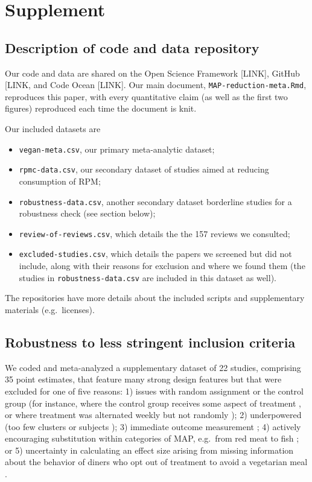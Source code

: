 \documentclass[sn-nature,referee,pdflatex]{sn-jnl}
\begin{document}
\newpage

\section{Supplement}\label{Sec5}

\subsection{Description of code and data
repository}\label{description-of-code-and-data-repository}

Our code and data are shared on the Open Science Framework {[}LINK{]},
GitHub {[}LINK, and Code Ocean {[}LINK{]}. Our main document,
\texttt{MAP-reduction-meta.Rmd}, reproduces this paper, with every
quantitative claim (as well as the first two figures) reproduced each
time the document is knit.

Our included datasets are

\begin{itemize}
\item
  \texttt{vegan-meta.csv}, our primary meta-analytic dataset;
\item
  \texttt{rpmc-data.csv}, our secondary dataset of studies aimed at
  reducing consumption of RPM;
\item
  \texttt{robustness-data.csv}, another secondary dataset borderline
  studies for a robustness check (see section below);
\item
  \texttt{review-of-reviews.csv}, which details the the 157 reviews we
  consulted;
\item
  \texttt{excluded-studies.csv}, which details the papers we screened
  but did not include, along with their reasons for exclusion and where
  we found them (the studies in \texttt{robustness-data.csv} are
  included in this dataset as well).
\end{itemize}

The repositories have more details about the included scripts and
supplementary materials (e.g.~licenses).

\subsection{Robustness to less stringent inclusion
criteria}\label{Sec5.1.1}

We coded and meta-analyzed a supplementary dataset of 22 studies,
comprising 35 point estimates, that feature many strong design features
but that were excluded for one of five reasons: 1) issues with random
assignment or the control group (for instance, where the control group
receives some aspect of treatment \citep{piazza2022}, or where treatment
was alternated weekly but not randomly \citep{garnett2020}); 2)
underpowered (too few clusters \citep{reinders2017} or subjects
\citep{lentz2019}); 3) immediate outcome measurement
\citep{dannenberg2023, sparkman2017, griesoph2021, hansen2021}; 4)
actively encouraging substitution within categories of MAP, e.g.~from
red meat to fish \citep{celis2017, johansen2009}; or 5) uncertainty in
calculating an effect size arising from missing information about the
behavior of diners who opt out of treatment to avoid a vegetarian meal
\citep{betterfoodfoundation2023}.
\end{document}

